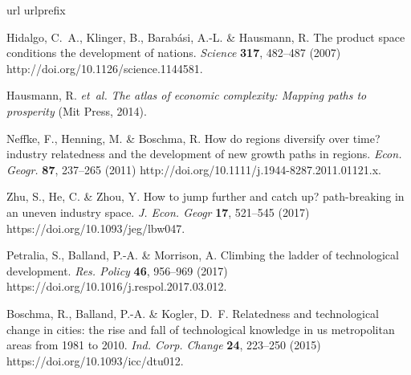 \documentclass[preprint,superscriptaddress,floatfix]{article}
\begin{document}
\begin{thebibliography}{10}
\expandafter\ifx\csname url\endcsname\relax
  \def\url#1{\texttt{#1}}\fi
\expandafter\ifx\csname urlprefix\endcsname\relax\def\urlprefix{URL }\fi
\providecommand{\bibinfo}[2]{#2}
\providecommand{\eprint}[2][]{\url{#2}}

\bibinfo{author}{Hidalgo, C.~A.}, \bibinfo{author}{Klinger, B.},
  \bibinfo{author}{Barab{\'a}si, A.-L.} \& \bibinfo{author}{Hausmann, R.}
\newblock \bibinfo{title}{The product space conditions the development of
  nations}.
\newblock \emph{\bibinfo{journal}{Science}} \textbf{\bibinfo{volume}{317}},
  \bibinfo{pages}{482--487} (\bibinfo{year}{2007})
  \bibinfo{url}{http://doi.org/10.1126/science.1144581}.

\bibinfo{author}{Hausmann, R.} \emph{et~al.}
\newblock \emph{\bibinfo{title}{The atlas of economic complexity: Mapping paths
  to prosperity}} (\bibinfo{publisher}{Mit Press}, \bibinfo{year}{2014}).

\bibinfo{author}{Neffke, F.}, \bibinfo{author}{Henning, M.} \&
  \bibinfo{author}{Boschma, R.}
\newblock \bibinfo{title}{How do regions diversify over time? industry
  relatedness and the development of new growth paths in regions}.
\newblock \emph{\bibinfo{journal}{Econ. Geogr.}} \textbf{\bibinfo{volume}{87}},
  \bibinfo{pages}{237--265} (\bibinfo{year}{2011})
  \bibinfo{url}{http://doi.org/10.1111/j.1944-8287.2011.01121.x}.

\bibinfo{author}{Zhu, S.}, \bibinfo{author}{He, C.} \& \bibinfo{author}{Zhou,
  Y.}
\newblock \bibinfo{title}{How to jump further and catch up? path-breaking in an
  uneven industry space}.
\newblock \emph{\bibinfo{journal}{J. Econ. Geogr}}
  \textbf{\bibinfo{volume}{17}}, \bibinfo{pages}{521--545}
  (\bibinfo{year}{2017})
  \bibinfo{url}{https://doi.org/10.1093/jeg/lbw047}.

\bibinfo{author}{Petralia, S.}, \bibinfo{author}{Balland, P.-A.} \&
  \bibinfo{author}{Morrison, A.}
\newblock \bibinfo{title}{Climbing the ladder of technological development}.
\newblock \emph{\bibinfo{journal}{Res. Policy}} \textbf{\bibinfo{volume}{46}},
  \bibinfo{pages}{956--969} (\bibinfo{year}{2017})
  \bibinfo{url}{https://doi.org/10.1016/j.respol.2017.03.012}.

\bibinfo{author}{Boschma, R.}, \bibinfo{author}{Balland, P.-A.} \&
  \bibinfo{author}{Kogler, D.~F.}
\newblock \bibinfo{title}{Relatedness and technological change in cities: the
  rise and fall of technological knowledge in us metropolitan areas from 1981
  to 2010}.
\newblock \emph{\bibinfo{journal}{Ind. Corp. Change}}
  \textbf{\bibinfo{volume}{24}}, \bibinfo{pages}{223--250}
  (\bibinfo{year}{2015})
  \bibinfo{url}{https://doi.org/10.1093/icc/dtu012}.


\end{thebibliography}
\end{document}
